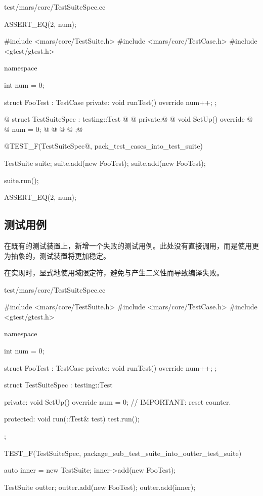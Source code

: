 \begin{content}
\begin{diff}{test/mars/core/TestSuiteSpec.cc}
\begin{minicpp}
{  ASSERT_EQ(2, num);
}
 \end{minicpp}
\tcblower
 \begin{minicpp}
#include <mars/core/TestSuite.h>
#include <mars/core/TestCase.h>
#include <gtest/gtest.h>

namespace {
  int num = 0;

  struct FooTest : TestCase {
  private:
    void runTest() override {
      num++;
    }
  };

@  struct TestSuiteSpec : testing::Test {@
@  private:@
@    void SetUp() override {@
@      num = 0; @
@    }@
@  };@
}

@TEST_F(TestSuiteSpec@, pack_test_cases_into_test_suite) {
  TestSuite suite;
  suite.add(new FooTest);
  suite.add(new FooTest);

  suite.run();

  ASSERT_EQ(2, num);
}
 \end{minicpp}
\end{diff}

\subsection{测试用例}

在既有的测试装置上，新增一个失败的测试用例。此处没有直接调用，而是使用更为抽象的，测试装置将更加稳定。

在实现时，显式地使用域限定符，避免与产生二义性而导致编译失败。

\begin{nodiff}{test/mars/core/TestSuiteSpec.cc}
 \begin{c++}
#include <mars/core/TestSuite.h>
#include <mars/core/TestCase.h>
#include <gtest/gtest.h>

namespace {
  int num = 0;

  struct FooTest : TestCase {
  private:
    void runTest() override {
      num++;
    }
  };

  struct TestSuiteSpec : testing::Test {
  private:
    void SetUp() override {
      num = 0;  // IMPORTANT: reset counter.
    }

  protected:
    void run(::Test& test) {
      test.run();
    }
  };
}

TEST_F(TestSuiteSpec, package_sub_test_suite_into_outter_test_suite) {
  auto inner = new TestSuite;
  inner->add(new FooTest);

  TestSuite outter;
  outter.add(new FooTest);
  outter.add(inner);

}
\end{c++}
\end{nodiff}
\end{content}
